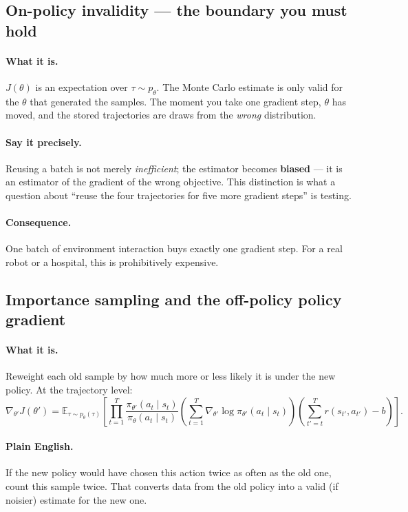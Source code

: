 \documentclass[11pt,a4paper]{article}
\begin{document}
\subsection{On-policy invalidity --- the boundary you must hold}

\paragraph{What it is.} $J(\theta)$ is an expectation over $\tau\sim p_\theta$.
The Monte Carlo estimate is only valid for the $\theta$ that generated the
samples. The moment you take one gradient step, $\theta$ has moved, and the
stored trajectories are draws from the \emph{wrong} distribution.

\paragraph{Say it precisely.} Reusing a batch is not merely
\emph{inefficient}; the estimator becomes \textbf{biased} --- it is an
estimator of the gradient of the wrong objective. This distinction is what a
question about ``reuse the four trajectories for five more gradient steps''
is testing.

\paragraph{Consequence.} One batch of environment interaction buys exactly one
gradient step. For a real robot or a hospital, this is prohibitively expensive.

\subsection{Importance sampling and the off-policy policy gradient}

\paragraph{What it is.} Reweight each old sample by how much more or less
likely it is under the new policy. At the trajectory level:
\[
\nabla_{\theta'}J(\theta')=\mathbb E_{\tau\sim p_\theta(\tau)}\!\left[
\prod_{t=1}^{T}\frac{\pi_{\theta'}(a_t\mid s_t)}{\pi_\theta(a_t\mid s_t)}
\left(\sum_{t=1}^{T}\nabla_{\theta'}\log\pi_{\theta'}(a_t\mid s_t)\right)
\left(\sum_{t'=t}^{T} r(s_{t'},a_{t'})-b\right)\right].
\]

\paragraph{Plain English.} If the new policy would have chosen this action
twice as often as the old one, count this sample twice. That converts data
from the old policy into a valid (if noisier) estimate for the new one.
\end{document}
